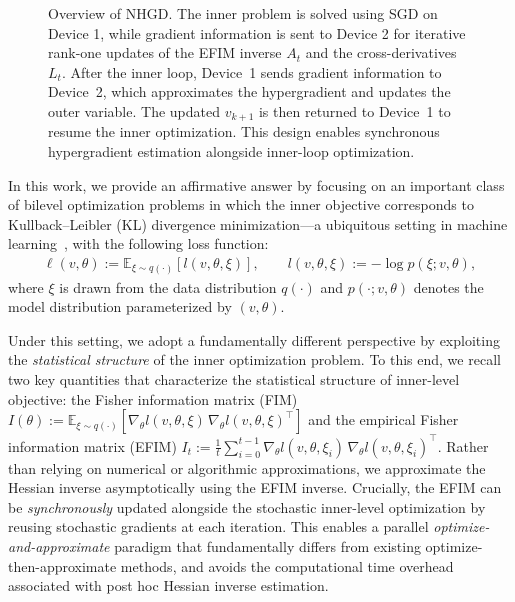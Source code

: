 \documentclass[11 pt]{article}
\begin{document}
\begin{figure}[!t]
    \caption{Overview of NHGD. The inner problem is solved using SGD on Device 1, while gradient information is sent to Device 2 for iterative rank-one updates of the EFIM inverse $A_t$ and the cross-derivatives $L_t$. After the inner loop, Device~1 sends gradient information to Device~2, which approximates the hypergradient and updates the outer variable. The updated $v_{k+1}$ is then returned to Device~1 to resume the inner optimization. This design enables synchronous hypergradient estimation alongside inner-loop optimization.}
    \label{fig:nhgd_overview}
\end{figure}

In this work, we provide an affirmative answer by focusing on an important class of bilevel optimization problems in which the inner objective corresponds to Kullback--Leibler (KL) divergence minimization—a ubiquitous setting in machine learning~\cite{kingma2013auto, murphy2022probabilistic}, with the following loss function:
\begin{align*}
    \ell(v,\theta) := \mathbb{E}_{\xi \sim q(\cdot)}[l(v,\theta,\xi)], 
    \qquad l(v,\theta,\xi) := -\log p(\xi;v,\theta),
\end{align*}
where $\xi$ is drawn from the data distribution $q(\cdot)$ and $p(\cdot;v,\theta)$ denotes the model distribution parameterized by $(v,\theta)$.


Under this setting, we adopt a fundamentally different perspective by exploiting the \emph{statistical structure} of the inner optimization problem.
To this end, we recall two key quantities that characterize the statistical structure of inner-level objective: the Fisher information matrix (FIM) $I(\theta) := \mathbb{E}_{\xi \sim q(\cdot)}\!\left[\nabla_{\theta} l(v,\theta,\xi)\,\nabla_{\theta} l(v,\theta,\xi)^\top\right]$ and the empirical Fisher information matrix (EFIM) $I_t:=\frac1t \sum_{i=0}^{t-1}\nabla_{\theta} l(v,\theta,\xi_i)\,\nabla_{\theta} l(v,\theta,\xi_i)^\top$.
Rather than relying on numerical or algorithmic approximations, we approximate the Hessian inverse asymptotically using the EFIM inverse. Crucially, the EFIM can be \emph{synchronously} updated alongside the stochastic inner-level optimization by reusing stochastic gradients at each iteration. 
This enables a parallel \emph{optimize-and-approximate} paradigm that fundamentally differs from existing optimize-then-approximate methods, and avoids the computational time overhead associated with post hoc Hessian inverse estimation.
\end{document}
